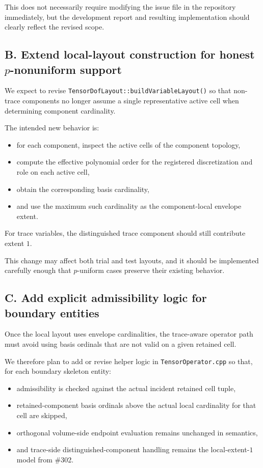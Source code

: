 \documentclass[11pt]{article}
\begin{document}
This does not necessarily require modifying the issue file in the repository immediately, but the development report and resulting implementation should clearly reflect the revised scope.

\subsection{B. Extend local-layout construction for honest \(p\)-nonuniform support}

We expect to revise \texttt{TensorDofLayout::buildVariableLayout()} so that non-trace components no longer assume a single representative active cell when determining component cardinality.

The intended new behavior is:
\begin{itemize}[leftmargin=*]
  \item for each component, inspect the active cells of the component topology,
  \item compute the effective polynomial order for the registered discretization and role on each active cell,
  \item obtain the corresponding basis cardinality,
  \item and use the maximum such cardinality as the component-local envelope extent.
\end{itemize}

For trace variables, the distinguished trace component should still contribute extent \(1\).

This change may affect both trial and test layouts, and it should be implemented carefully enough that \(p\)-uniform cases preserve their existing behavior.

\subsection{C. Add explicit admissibility logic for boundary entities}

Once the local layout uses envelope cardinalities, the trace-aware operator path must avoid using basis ordinals that are not valid on a given retained cell.

We therefore plan to add or revise helper logic in \texttt{TensorOperator.cpp} so that, for each boundary skeleton entity:
\begin{itemize}[leftmargin=*]
  \item admissibility is checked against the actual incident retained cell tuple,
  \item retained-component basis ordinals above the actual local cardinality for that cell are skipped,
  \item orthogonal volume-side endpoint evaluation remains unchanged in semantics,
  \item and trace-side distinguished-component handling remains the local-extent-\(1\) model from \#302.
\end{itemize}
\end{document}
